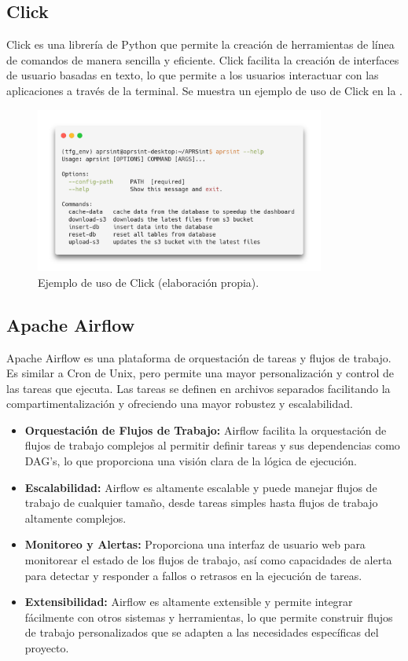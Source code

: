 \subsection*{Click}
Click es una librería de Python que permite la creación de herramientas de línea de comandos de manera sencilla y eficiente. Click facilita la creación de interfaces de usuario basadas en texto, lo que permite a los usuarios interactuar con las aplicaciones a través de la terminal. Se muestra un ejemplo de uso de Click en la .
\begin{figure}[!h]
	\centering
	\includegraphics[width=0.85\textwidth]{Imagenes/Chapter_4/click_help.png}
	\caption[Ejemplo de uso de Click.]{Ejemplo de uso de Click (elaboración propia).}
	\label{fig:click-example}
\end{figure}

\subsection*{Apache Airflow}
Apache Airflow es una plataforma de orquestación de tareas y flujos de trabajo. Es similar a Cron de Unix, pero permite una mayor personalización y control de las tareas que ejecuta. Las tareas se definen en archivos separados facilitando la compartimentalización y ofreciendo una mayor robustez y escalabilidad.
\begin{itemize}
	\item \textbf{Orquestación de Flujos de Trabajo:} Airflow facilita la orquestación de flujos de trabajo complejos al permitir definir tareas y sus dependencias como DAG's, lo que proporciona una visión clara de la lógica de ejecución.
	\item \textbf{Escalabilidad:} Airflow es altamente escalable y puede manejar flujos de trabajo de cualquier tamaño, desde tareas simples hasta flujos de trabajo altamente complejos.
	\item \textbf{Monitoreo y Alertas:} Proporciona una interfaz de usuario web para monitorear el estado de los flujos de trabajo, así como capacidades de alerta para detectar y responder a fallos o retrasos en la ejecución de tareas.
	\item \textbf{Extensibilidad:} Airflow es altamente extensible y permite integrar fácilmente con otros sistemas y herramientas, lo que permite construir flujos de trabajo personalizados que se adapten a las necesidades específicas del proyecto.
\end{itemize}

